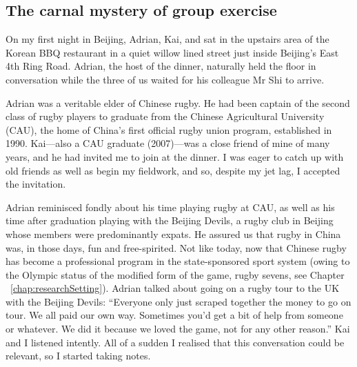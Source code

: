                                           \begin{CJK}{UTF8}{gbsn}

\section{The carnal mystery of group exercise \label{sect:adrian}}


On my first night in Beijing, Adrian, Kai, and sat in the upstairs area of the Korean BBQ restaurant in a quiet willow lined street just inside Beijing's East 4th Ring Road.  Adrian, the host of the dinner, naturally held the floor in conversation while the three of us waited for his colleague Mr Shi to arrive.

Adrian was a veritable elder of Chinese rugby. He had been captain of the second class of rugby players to graduate from the Chinese Agricultural University (CAU), the home of China's first official rugby union program, established in 1990. Kai---also a CAU graduate (2007)---was a close friend of mine of many years, and he had invited me to join at the dinner.  I was eager to catch up with old friends as well as begin my fieldwork, and so, despite my jet lag, I accepted the invitation.

Adrian reminisced fondly about his time playing rugby at CAU, as well as his time after graduation playing with the Beijing Devils, a rugby club in Beijing whose members were predominantly expats.  He assured us that rugby in China was, in those days, fun and free-spirited.  Not like today, now that Chinese rugby has become a professional program in the state-sponsored sport system (owing to the Olympic status of the modified form of the game, rugby sevens, see Chapter ~\ref{chap:researchSetting}).  Adrian talked about going on a rugby tour to the UK with the Beijing Devils:  ``Everyone only just scraped together the money to go on tour.  We all paid our own way. Sometimes you'd get a bit of help from someone or whatever. We did it because we loved the game, not for any other reason.''   Kai and I listened intently.  All of a sudden I realised that this conversation could be relevant, so I started taking notes.


\end{CJK}
